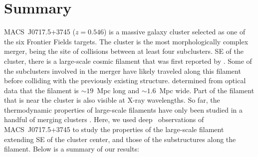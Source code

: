 \section{Summary}
\label{sec:Summary}

MACS~J0717.5+3745 ($z=0.546$) is a massive galaxy cluster selected as one of the six Frontier Fields targets. The cluster is the most morphologically complex merger, being the site of collisions between at least four subclusters. SE of the cluster, there is a large-scale cosmic filament that was first reported by \citet{Ebeling2004}. Some of the subclusters involved in the merger have likely traveled along this filament before colliding with the previously existing structure. \citet{Jauzac2012} determined from optical data that the filament is $\sim 19$~Mpc long and $\sim 1.6$~Mpc wide. Part of the filament that is near the cluster is also visible at X-ray wavelengths. So far, the thermodynamic properties of large-scale filaments have only been studied in a handful of merging clusters \citep{Werner2008, Eckert2015, Bulbul2016}. Here, we used deep \chandra\ observations of MACS~J0717.5+3745 to study the properties of the large-scale filament extending SE of the cluster center, and those of the substructures along the filament. Below is a summary of our results:

